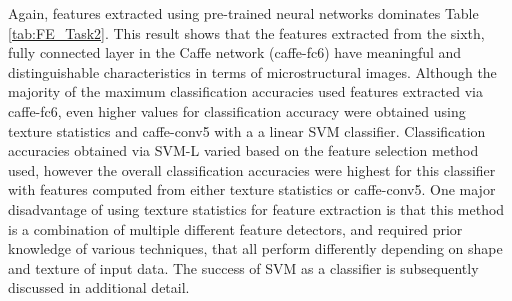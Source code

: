 Again, features extracted using pre-trained neural networks dominates Table \ref{tab:FE_Task2}. This result shows that the features extracted from the sixth, fully connected layer in the Caffe network (caffe-fc6) have meaningful and distinguishable characteristics in terms of microstructural images.  
%
Although the majority of the maximum classification accuracies used features extracted via caffe-fc6, even higher values for classification accuracy were obtained using texture statistics and caffe-conv5 with a a linear SVM classifier. Classification accuracies obtained via SVM-L varied based on the feature selection method used, however the overall classification accuracies were highest for this classifier with features computed from either texture statistics or caffe-conv5.  %
%
One major disadvantage of using texture statistics for feature extraction is that this method is a combination of multiple different feature detectors, and required prior knowledge of various techniques, that all perform differently depending on shape and texture of input data. 
%
The success of SVM as a classifier is subsequently discussed in additional detail.  

